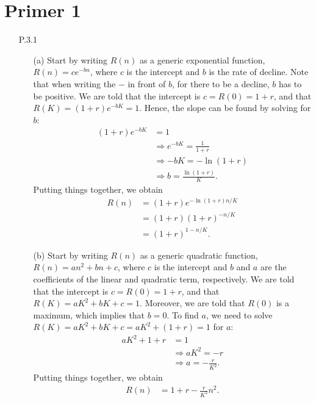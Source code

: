 \section{Primer 1}

\begin{enumerate}
	
	\item[P.3.1]
		\begin{itemize}
			\item[(a)] Start by writing $R(n)$ as a generic exponential function, $R(n) = c e^{-b n}$, where $c$ is the intercept and $b$ is the rate of decline. Note that when writing the $-$ in front of $b$, for there to be a decline, $b$ has to be positive. We are told that the intercept is $c = R(0) = 1 + r$, and that $R(K) = (1+r) e^{-b K} = 1$. Hence, the slope can be found by solving for $b$:
			\begin{equation}
				\begin{split}
					(1+r) e^{-b K}& = 1\\
					&\Rightarrow e^{-b K} = \frac{1}{1+r}\\
					&\Rightarrow -b K = - \ln(1+r)\\
					&\Rightarrow b = \frac{\ln(1+r)}{K}.
				\end{split}
			\end{equation}
			Putting things together, we obtain
			\begin{equation}
				\begin{split}
					 R(n) &= (1+r) e^{-\ln(1+r)n/K}\\
					& = (1+r)(1+r)^{-n/K}\\
					& = (1+r)^{1-n/K}.
				\end{split}
			\end{equation}
			
			\item[(b)] Start by writing $R(n)$ as a generic quadratic function, $R(n) = a n^2 + bn + c$, where $c$ is the intercept and $b$ and $a$ are the coefficients of the linear and quadratic term, respectively. We are told that the intercept is $c = R(0) = 1 + r$, and that $R(K) = a K^2 + bK + c = 1$. Moreover, we are told that $R(0)$ is a maximum, which implies that $b = 0$. To find $a$, we need to solve $R(K) = a K^2 + bK + c = a K^2 + (1+r) = 1$ for $a$:
			\begin{equation}
				\begin{split}
					 a K^2 + 1 + r &= 1\\
					&\Rightarrow  a K^2 = -r \\
					&\Rightarrow a = -\frac{r}{K^2}.
				\end{split}
			\end{equation}
			Putting things together, we obtain
			\begin{equation}
				\begin{split}
					R(n) &= 1+r - \frac{r}{K^2}n^2.
				\end{split}
			\end{equation}
			

\end{itemize}
\end{enumerate}
